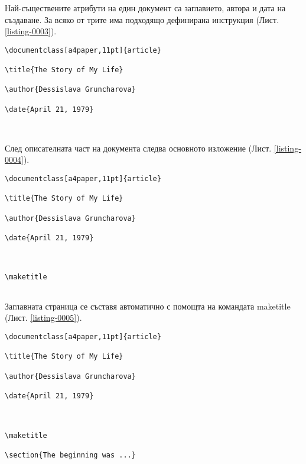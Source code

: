 Най-съществените атрибути на един документ са заглавието, автора и дата на създаване. За всяко от трите има подходящо дефинирана инструкция (Лист. \ref{listing-0003}).

\begin{lstlisting}[language={[LaTeX]TeX}, caption=Тяло на документа, label=listing-0004]
\documentclass[a4paper,11pt]{article}

\title{The Story of My Life}

\author{Dessislava Gruncharova}

\date{April 21, 1979}



\end{lstlisting}

След описателната част на документа следва основното изложение (Лист. \ref{listing-0004}).

\begin{lstlisting}[language={[LaTeX]TeX}, caption=Инструкция за създаване на заглавна страница, label=listing-0005]
\documentclass[a4paper,11pt]{article}

\title{The Story of My Life}

\author{Dessislava Gruncharova}

\date{April 21, 1979}



\maketitle


\end{lstlisting}

Заглавната страница се съставя автоматично с помощта на командата maketitle (Лист. \ref{listing-0005}).

\begin{lstlisting}[language={[LaTeX]TeX}, caption=Оформяне на секция в документа, label=listing-0006]
\documentclass[a4paper,11pt]{article}

\title{The Story of My Life}

\author{Dessislava Gruncharova}

\date{April 21, 1979}



\maketitle

\section{The beginning was ...}


\end{lstlisting}

